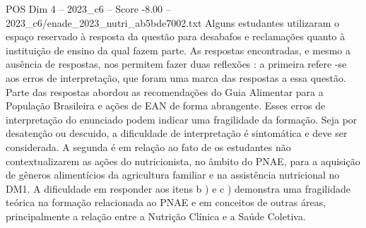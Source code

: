 \begin{textsample}{POS Dim 4 – 2023\_c6 – Score -8.00 – 2023\_c6/enade\_2023\_nutri\_ab5bde7002.txt}
Alguns estudantes utilizaram o espaço reservado à resposta da questão para desabafos e reclamações quanto à instituição de ensino da qual fazem parte.
As respostas encontradas, e mesmo a ausência de respostas, nos permitem fazer duas reflexões : a primeira refere -se aos erros de interpretação, que foram uma marca das respostas a essa questão.
Parte das respostas abordou as recomendações do Guia Alimentar para a População Brasileira e ações de EAN de forma abrangente.
Esses erros de interpretação do enunciado podem indicar uma fragilidade da formação.
Seja por desatenção ou descuido, a dificuldade de interpretação é sintomática e deve ser considerada.
A segunda é em relação ao fato de os estudantes não contextualizarem as ações do nutricionista, no âmbito do PNAE, para a aquisição de gêneros alimentícios da agricultura familiar e na assistência nutricional no DM1.
A dificuldade em responder aos itens b ) e c ) demonstra uma fragilidade teórica na formação relacionada ao PNAE e em conceitos de outras áreas, principalmente a relação entre a Nutrição Clínica e a Saúde Coletiva.

\end{textsample}
